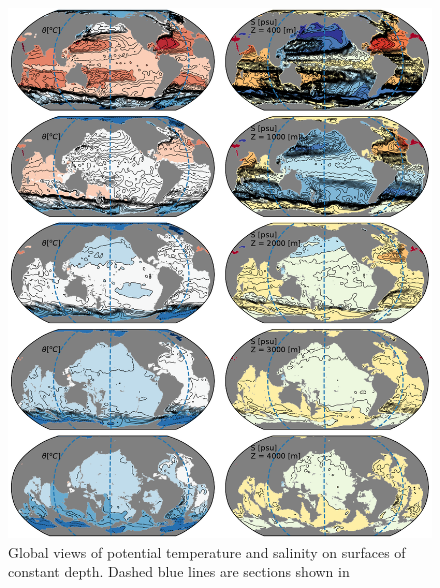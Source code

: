 \begin{figure}
  \centering
  \includegraphics[width=7in]{figs/WaterMasses/TSDepthSurf.pdf}
    \caption{Global views of potential temperature and salinity on surfaces of constant depth.  Dashed blue lines are sections shown in }
    \label{fig:TSDepthSurf}  
\end{figure}

